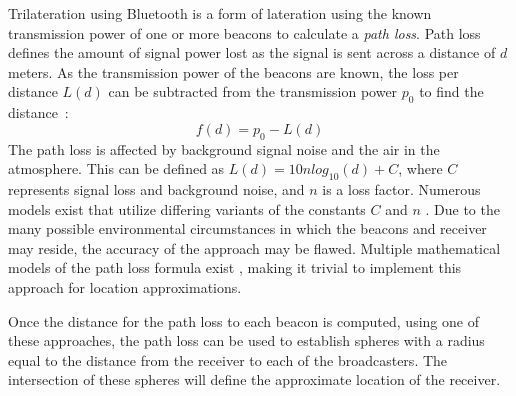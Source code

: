 Trilateration using Bluetooth is a form of lateration using the known transmission power of one or more beacons to calculate a \textit{path loss}.
Path loss defines the amount of signal power lost as the signal is sent across a distance of $d$ meters.
As the transmission power of the beacons are known, the loss per distance $L(d)$ can be subtracted from the transmission power $p_0$ to find the distance~\cite{taking_localization_to_the_wild}:
\begin{equation}\label{distance_equation}
    f(d) = p_0 - L(d)
\end{equation}
The path loss is affected by background signal noise and the air in the atmosphere.
This can be defined as $L(d) = 10n log_{10}(d)+C$, where $C$ represents signal loss and background noise, and $n$ is a loss factor. \cite{taking_localization_to_the_wild}
Numerous models exist that utilize differing variants of the constants $C$ and $n$ \cite{path_loss_models}.
Due to the many possible environmental circumstances in which the beacons and receiver may reside, the accuracy of the approach may be flawed\cite{presence_ble_review}. 
Multiple mathematical models of the path loss formula exist \cite{rssi_indoor_pos,positioning_alg_rssi, RSSI_ZigBee_distance}, making it trivial to implement this approach for location approximations.	  
  
Once the distance for the path loss to each beacon is computed, using one of these approaches, the path loss can be used to establish spheres with a radius equal to the distance from the receiver to each of the broadcasters. 	 
The intersection of these spheres will define the approximate location of the receiver. 